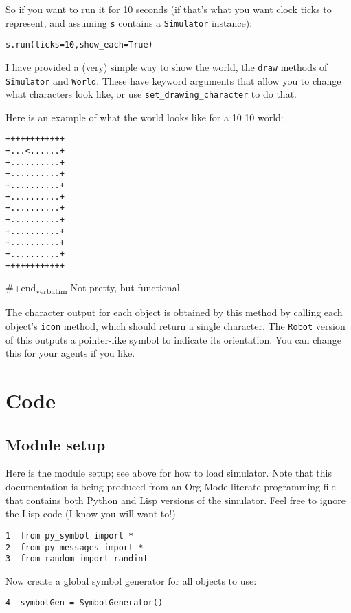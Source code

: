 \documentclass[11pt]{tufte-handout}
\begin{document}
So if you want to run it for 10 seconds (if that's what you want  clock ticks to represent, and assuming \texttt{s} contains a \texttt{Simulator} instance):
\begin{verbatim}
s.run(ticks=10,show_each=True)
\end{verbatim}


I have provided a (very) simple way to show the world, the \texttt{draw} methods of \texttt{Simulator} and \texttt{World}. These have keyword arguments that allow you to change what characters look like, or use \texttt{set\_drawing\_character} to do that.

Here is an example of what the world looks like for a 10 \texttimes{} 10 world:
\begin{verbatim}
++++++++++++
+...<......+
+..........+
+..........+
+..........+
+..........+
+..........+
+..........+
+..........+
+..........+
+..........+
++++++++++++
\end{verbatim}

\#+end\textsubscript{verbatim}
\noident Not pretty, but functional.

The character output for each object is obtained by this method by calling each object's \texttt{icon} method, which should return a single character.  The \texttt{Robot} version of this outputs a pointer-like symbol to indicate its orientation.  You can change this for your agents if you like.

\section{Code}
\label{sec:org0f02b35}
\label{org70b3e8d}

\subsection{Module setup}
\label{sec:org8501721}

Here is the module setup; see above for how to load simulator.  Note that this documentation is being produced from an Org Mode literate programming file that contains both Python and Lisp versions of the simulator.  Feel free to ignore the Lisp code (I know you will want to!).

\begin{verbatim}
1  from py_symbol import *
2  from py_messages import *
3  from random import randint
\end{verbatim}

Now create a global symbol generator for all objects to use:
\begin{verbatim}
4  symbolGen = SymbolGenerator()
\end{verbatim}
\end{document}
